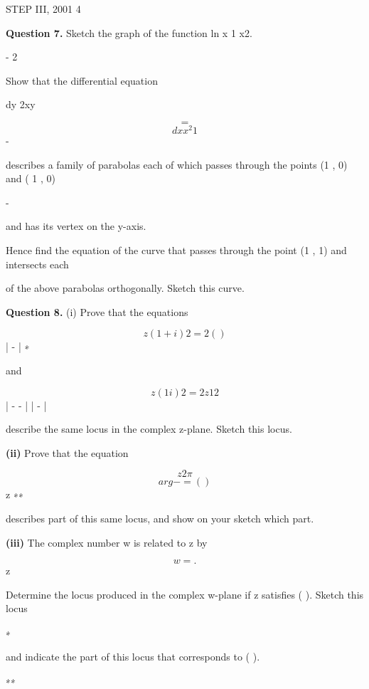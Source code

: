 \documentclass[12pt]{article}
\begin{document}
\begin{flushleft}
STEP III, 2001 4\par
\bigskip\textbf{Question 7.} Sketch the graph of the function ln x 1 x2.\par
- 2\par
Show that the differential equation\par
dy 2xy\par
\[=\]
\[dx x^2 1\]
-\par
describes a family of parabolas each of which passes through the points (1 , 0) and ( 1 , 0)\par
-\par
and has its vertex on the y-axis.\par
Hence find the equation of the curve that passes through the point (1 , 1) and intersects each\par
of the above parabolas orthogonally. Sketch this curve.\par
[Two curves intersect orthogonally if their tangents at the point of intersection are perpendic-\par
ular.]\par
\bigskip\textbf{Question 8.} (i) Prove that the equations\par
\[z (1 + i) 2 = 2 ( )\]
| - | ∗\par
and\par
\[z (1 i) 2 = 2 z 1 2\]
| - - | | - |\par
describe the same locus in the complex z-plane. Sketch this locus.\par
\textbf{(ii)} Prove that the equation\par
\[z 2 \pi\]
\[arg - = ( )\]
\lambda z  ∗∗\par
describes part of this same locus, and show on your sketch which part.\par
\textbf{(iii)} The complex number w is related to z by\par
\[w = .\]
z\par
Determine the locus produced in the complex w-plane if z satisfies ( ). Sketch this locus\par
∗\par
and indicate the part of this locus that corresponds to ( ).\par
∗∗\par
\end{flushleft}
\end{document}

